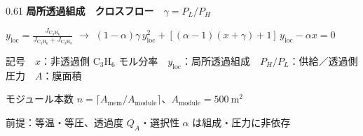 \begin{frame}[t]
\begin{columns}[T,onlytextwidth]
\begin{column}{0.61\textwidth}
      \vspace{0.42em}
      {\footnotesize\bfseries 局所透過組成　クロスフロー　$\gamma = P_L/P_H$}\par
      \vspace{0.12em}
      {\footnotesize\centering
       $\displaystyle y_{\mathrm{loc}} = \frac{J_{\mathrm{C_3H_6}}}{J_{\mathrm{C_3H_6}}+J_{\mathrm{C_3H_8}}}$
       \quad$\to$\quad
       $(1-\alpha)\gamma\,y_{\mathrm{loc}}^2 + [(\alpha-1)(x+\gamma)+1]\,y_{\mathrm{loc}} - \alpha x = 0$\par}

      \vspace{0.45em}
      {\scriptsize\raggedright
       記号　$x$：非透過側 $\mathrm{C_3H_6}$ モル分率　$y_{\mathrm{loc}}$：局所透過組成　$P_H/P_L$：供給／透過側圧力　$A$：膜面積\par
       \vspace{0.15em}
       モジュール本数 $n=\lceil A_{\mathrm{mem}}/A_{\mathrm{module}}\rceil$、$A_{\mathrm{module}}=500\ \mathrm{m^2}$\par
       \vspace{0.15em}
       {\color{black!55} 前提：等温・等圧、透過度 $Q_A$・選択性 $\alpha$ は組成・圧力に非依存}\par}
    \end{column}
  \end{columns}

\end{frame}
